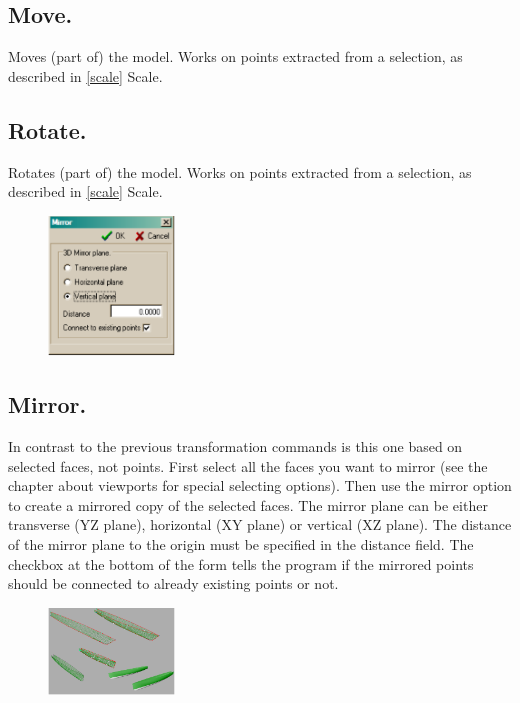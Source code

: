 \documentclass[12pt]{article}
\begin{document}
\subsection{Move.}
Moves (part of) the model. Works on points extracted from a selection,
as described in \ref{scale} Scale.

\subsection{Rotate.}
Rotates (part of) the model. Works on points extracted from a
selection, as described in \ref{scale} Scale.

\begin{figure}
        \centering
        \includegraphics[width=0.3\textwidth,natwidth=279,natheight=308]{mirrordialog.png}
        \caption{}
        \label{fig:mirrordialog}
\end{figure}

\subsection{Mirror.}
In contrast to the previous transformation commands is this one based
on selected faces, not points. First select all the faces you want to
mirror (see the chapter about viewports for special selecting
options). Then use the mirror option to create a mirrored copy of the
selected faces. The mirror plane can be either transverse (YZ plane),
horizontal (XY plane) or vertical (XZ plane). The distance of the
mirror plane to the origin must be specified in the distance field.
The checkbox at the bottom of the form tells the program if the
mirrored points should be connected to already existing points or not.

\begin{figure}
        \centering
        \includegraphics[width=0.3\textwidth,natwidth=443,natheight=303]{mirrorcatamaran.png}
        \caption{}
        \label{fig:mirrorcatamaran}
\end{figure}
\end{document}
